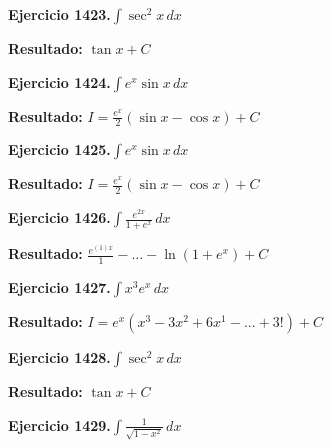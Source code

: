 \documentclass[10pt,a4paper]{article}
\begin{document}
\newpage
\begin{ejbox}
\textbf{Ejercicio 1423.}\quad $\int \sec^2 x\,dx$
\end{ejbox}

\begin{solbox}
\textbf{Resultado:} \(\displaystyle \tan x + C\)
\end{solbox}

\begin{ejbox}
\textbf{Ejercicio 1424.}\quad $\int e^x\sin x\,dx$
\end{ejbox}

\begin{solbox}
\textbf{Resultado:} \(\displaystyle I = \frac{e^x}{2}(\sin x - \cos x) + C\)
\end{solbox}

\begin{ejbox}
\textbf{Ejercicio 1425.}\quad $\int e^x\sin x\,dx$
\end{ejbox}

\begin{solbox}
\textbf{Resultado:} \(\displaystyle I = \frac{e^x}{2}(\sin x - \cos x) + C\)
\end{solbox}

\newpage
\begin{ejbox}
\textbf{Ejercicio 1426.}\quad $\int \frac{e^{2x}}{1+e^{x}}\,dx$
\end{ejbox}

\begin{solbox}
\textbf{Resultado:} \(\displaystyle \frac{e^{(1)x}}{1} - ... - \ln(1+e^x) + C\)
\end{solbox}

\begin{ejbox}
\textbf{Ejercicio 1427.}\quad $\int x^{3} e^x\,dx$
\end{ejbox}

\begin{solbox}
\textbf{Resultado:} \(\displaystyle I = e^x(x^{3} - 3x^{2} + 6x^{1} - ... + 3!) + C\)
\end{solbox}

\begin{ejbox}
\textbf{Ejercicio 1428.}\quad $\int \sec^2 x\,dx$
\end{ejbox}

\begin{solbox}
\textbf{Resultado:} \(\displaystyle \tan x + C\)
\end{solbox}

\newpage
\begin{ejbox}
\textbf{Ejercicio 1429.}\quad $\int \frac{1}{\sqrt{1-x^2}}\,dx$
\end{ejbox}
\end{document}
